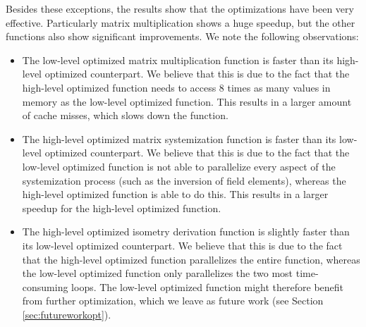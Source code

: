\documentclass[11pt,a4paper]{report}
\theoremstyle{definition}
\begin{document}
Besides these exceptions, the results show that the optimizations have been very effective. Particularly matrix multiplication shows a huge speedup, but the other functions also show significant improvements. We note the following observations:
\begin{itemize}
  \item The low-level optimized matrix multiplication function is faster than its high-level optimized counterpart. We believe that this is due to the fact that the high-level optimized function needs to access 8 times as many values in memory as the low-level optimized function. This results in a larger amount of cache misses, which slows down the function.
  \item The high-level optimized matrix systemization function is faster than its low-level optimized counterpart. We believe that this is due to the fact that the low-level optimized function is not able to parallelize every aspect of the systemization process (such as the inversion of field elements), whereas the high-level optimized function is able to do this. This results in a larger speedup for the high-level optimized function.
  \item The high-level optimized isometry derivation function is slightly faster than its low-level optimized counterpart. We believe that this is due to the fact that the high-level optimized function parallelizes the entire function, whereas the low-level optimized function only parallelizes the two most time-consuming loops. The low-level optimized function might therefore benefit from further optimization, which we leave as future work (see Section \ref{sec:futureworkopt}).
\end{itemize}
\end{document}
